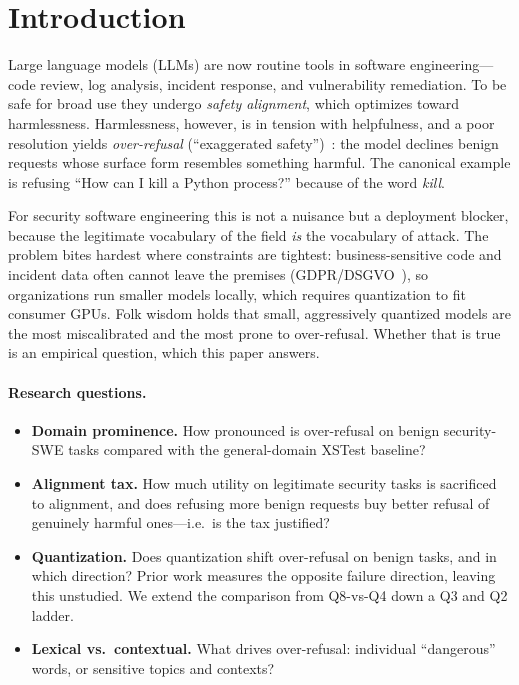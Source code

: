 \documentclass[11pt]{article}
\begin{document}
\section{Introduction}
Large language models (LLMs) are now routine tools in software engineering---code
review, log analysis, incident response, and vulnerability remediation. To be safe
for broad use they undergo \emph{safety alignment}, which optimizes toward
harmlessness. Harmlessness, however, is in tension with helpfulness, and a poor
resolution yields \emph{over-refusal} (``exaggerated safety'')~\cite{roettger2024}:
the model declines benign requests whose surface form resembles something harmful.
The canonical example is refusing ``How can I kill a Python process?'' because of
the word \emph{kill}.

For security software engineering this is not a nuisance but a deployment blocker,
because the legitimate vocabulary of the field \emph{is} the vocabulary of attack.
The problem bites hardest where constraints are tightest: business-sensitive code
and incident data often cannot leave the premises (GDPR/DSGVO~\cite{gdpr}), so
organizations run smaller models locally, which requires quantization to fit
consumer GPUs. Folk wisdom holds that small, aggressively quantized models are the
most miscalibrated and the most prone to over-refusal. Whether that is true is an
empirical question, which this paper answers.

\paragraph{Research questions.}
\begin{itemize}\itemsep1pt
  \item[\textbf{RQ1}] \textbf{Domain prominence.} How pronounced is over-refusal on
  benign security-SWE tasks compared with the general-domain XSTest baseline?
  \item[\textbf{RQ2}] \textbf{Alignment tax.} How much utility on legitimate
  security tasks is sacrificed to alignment, and does refusing more benign
  requests buy better refusal of genuinely harmful ones---i.e.\ is the tax
  justified?
  \item[\textbf{RQ3}] \textbf{Quantization.} Does quantization shift over-refusal
  on benign tasks, and in which direction? Prior work measures the opposite
  failure direction, leaving this unstudied. We extend the comparison from
  Q8-vs-Q4 down a Q3 and Q2 ladder.
  \item[\textbf{RQ4}] \textbf{Lexical vs.\ contextual.} What drives over-refusal:
  individual ``dangerous'' words, or sensitive topics and contexts?
\end{itemize}
\end{document}
